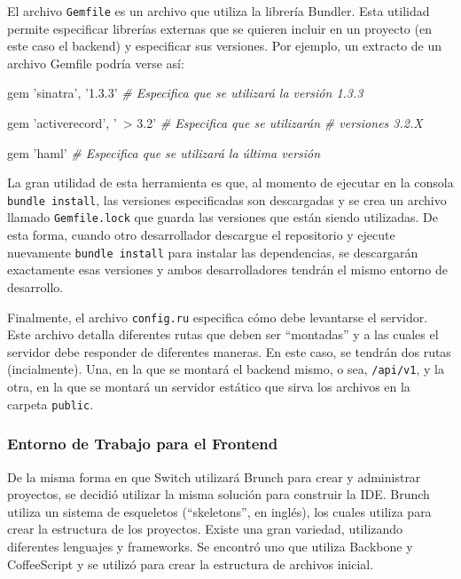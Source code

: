 \documentclass[12pt,spanish,letter]{report}
\newenvironment{Shaded}{}{}
\newcommand{\StringTok}[1]{\textcolor[rgb]{0.25,0.44,0.63}{{#1}}}
\newcommand{\CommentTok}[1]{\textcolor[rgb]{0.38,0.63,0.69}{\textit{{#1}}}}
\newcommand{\NormalTok}[1]{{#1}}
\begin{document}
El archivo \texttt{Gemfile} es un archivo que utiliza la librería
Bundler. Esta utilidad permite especificar librerías externas que se
quieren incluir en un proyecto (en este caso el backend) y especificar
sus versiones. Por ejemplo, un extracto de un archivo Gemfile podría
verse así:

\begin{Shaded}
\begin{Highlighting}[]
\NormalTok{gem }\StringTok{'sinatra'}\NormalTok{, }\StringTok{'1.3.3'} \CommentTok{# Especifica que se utilizará la versión 1.3.3}

\NormalTok{gem }\StringTok{'activerecord'}\NormalTok{, }\StringTok{'~> 3.2'} \CommentTok{# Especifica que se utilizarán }
                             \CommentTok{# versiones 3.2.X}

\NormalTok{gem }\StringTok{'haml'} \CommentTok{# Especifica que se utilizará la última versión}
\end{Highlighting}
\end{Shaded}

La gran utilidad de esta herramienta es que, al momento de ejecutar en
la consola \texttt{bundle install}, las versiones especificadas son
descargadas y se crea un archivo llamado \texttt{Gemfile.lock} que
guarda las versiones que están siendo utilizadas. De esta forma, cuando
otro desarrollador descargue el repositorio y ejecute nuevamente
\texttt{bundle install} para instalar las dependencias, se descargarán
exactamente esas versiones y ambos desarrolladores tendrán el mismo
entorno de desarrollo.

Finalmente, el archivo \texttt{config.ru} especifica cómo debe
levantarse el servidor. Este archivo detalla diferentes rutas que deben
ser ``montadas'' y a las cuales el servidor debe responder de diferentes
maneras. En este caso, se tendrán dos rutas (incialmente). Una, en la
que se montará el backend mismo, o sea, \texttt{/api/v1}, y la otra, en
la que se montará un servidor estático que sirva los archivos en la
carpeta \texttt{public}.

\subsubsection{Entorno de Trabajo para el Frontend}

De la misma forma en que Switch utilizará Brunch para crear y
administrar proyectos, se decidió utilizar la misma solución para
construir la IDE. Brunch utiliza un sistema de esqueletos
(``skeletons'', en inglés), los cuales utiliza para crear la estructura
de los proyectos. Existe una gran variedad, utilizando diferentes
lenguajes y frameworks. Se encontró uno que utiliza Backbone y
CoffeeScript y se utilizó para crear la estructura de archivos inicial.
\end{document}
